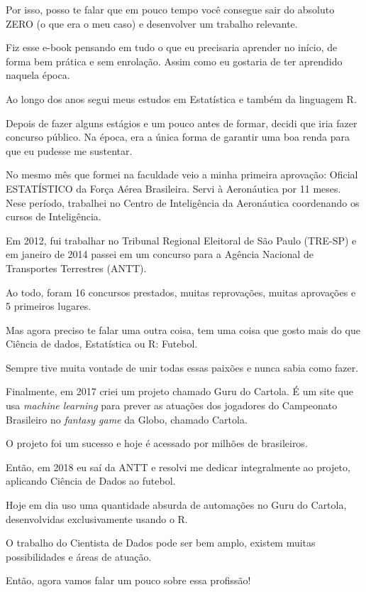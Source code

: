 \documentclass[
]{book}
\begin{document}
Por isso, posso te falar que em pouco tempo você consegue sair do
absoluto ZERO (o que era o meu caso) e desenvolver um trabalho
relevante.

Fiz esse e-book pensando em tudo o que eu precisaria aprender no início,
de forma bem prática e sem enrolação. Assim como eu gostaria de ter
aprendido naquela época.

Ao longo dos anos segui meus estudos em Estatística e também da
linguagem R.

Depois de fazer alguns estágios e um pouco antes de formar, decidi que
iria fazer concurso público. Na época, era a única forma de garantir uma
boa renda para que eu pudesse me sustentar.

No mesmo mês que formei na faculdade veio a minha primeira aprovação:
Oficial ESTATÍSTICO da Força Aérea Brasileira. Servi à Aeronáutica por
11 meses. Nese período, trabalhei no Centro de Inteligência da
Aeronáutica coordenando os cursos de Inteligência.

Em 2012, fui trabalhar no Tribunal Regional Eleitoral de São Paulo
(TRE-SP) e em janeiro de 2014 passei em um concurso para a Agência
Nacional de Transportes Terrestres (ANTT).

Ao todo, foram 16 concursos prestados, muitas reprovações, muitas
aprovações e 5 primeiros lugares.

Mas agora preciso te falar uma outra coisa, tem uma coisa que gosto mais
do que Ciência de dados, Estatística ou R: Futebol.

Sempre tive muita vontade de unir todas essas paixões e nunca sabia como
fazer.

Finalmente, em 2017 criei um projeto chamado Guru do Cartola. É um site
que usa \emph{machine learning} para prever as atuações dos jogadores do
Campeonato Brasileiro no \emph{fantasy game} da Globo, chamado Cartola.

O projeto foi um sucesso e hoje é acessado por milhões de brasileiros.

Então, em 2018 eu saí da ANTT e resolvi me dedicar integralmente ao
projeto, aplicando Ciência de Dados ao futebol.

Hoje em dia uso uma quantidade absurda de automações no Guru do Cartola,
desenvolvidas exclusivamente usando o R.

O trabalho do Cientista de Dados pode ser bem amplo, existem muitas
possibilidades e áreas de atuação.

Então, agora vamos falar um pouco sobre essa profissão!
\end{document}
